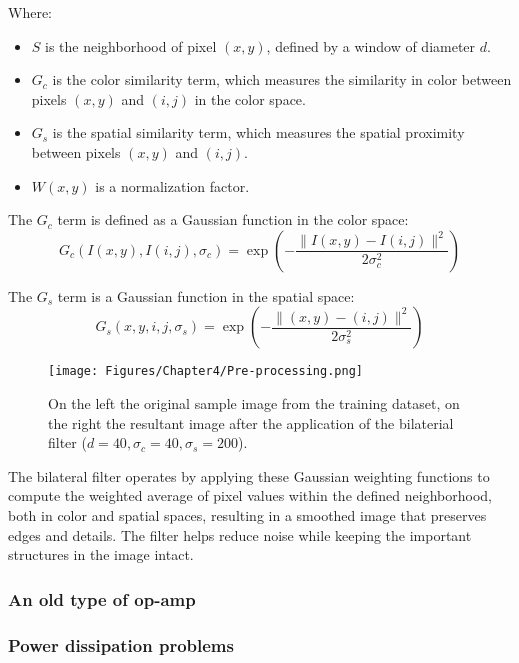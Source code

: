 Where:
\begin{itemize}
    \item \(S\) is the neighborhood of pixel \((x, y)\), defined by a window of diameter \(d\).
    \item \(G_c\) is the color similarity term, which measures the similarity in color between pixels \((x, y)\) and \((i, j)\) in the color space.
    \item \(G_s\) is the spatial similarity term, which measures the spatial proximity between pixels \((x, y)\) and \((i, j)\).
    \item \(W(x, y)\) is a normalization factor.
\end{itemize}
The \(G_c\) term is defined as a Gaussian function in the color space:
\begin{equation}
    G_c(I(x, y), I(i, j), \sigma_c) = \exp\left(-\frac{\|I(x, y) - I(i, j)\|^2}{2\sigma_c^2}\right)
\end{equation}

The \(G_s\) term is a Gaussian function in the spatial space:
\begin{equation}
    G_s(x, y, i, j, \sigma_s) = \exp\left(-\frac{\|(x, y) - (i, j)\|^2}{2\sigma_s^2}\right)
\end{equation}

\begin{figure}[th]
    \centering
    \texttt{[image: Figures/Chapter4/Pre-processing.png]}
    \caption[Input and pre-processed image.]{On the left the original sample image from the training dataset, on the right the resultant image after the application of the bilaterial filter ($d = 40,\sigma_c = 40,\sigma_s = 200$).}
    \label{fig:Pre-processing}
\end{figure}

The bilateral filter operates by applying these Gaussian weighting functions to compute the weighted average of pixel values within the defined neighborhood, both in color and spatial spaces, resulting in a smoothed image that preserves edges and details. The filter helps reduce noise while keeping the important structures in the image intact.

\subsubsection{An old type of op-amp}
\subsubsection{Power dissipation problems}

